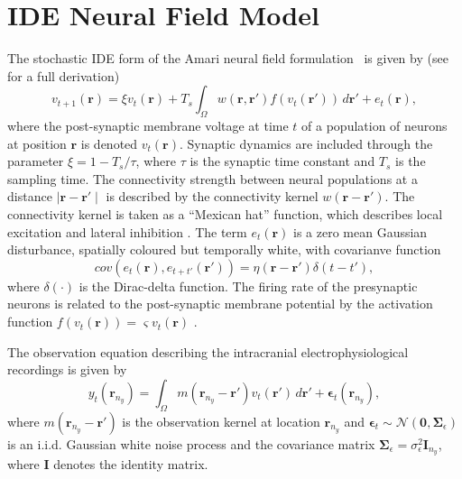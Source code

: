 \documentclass[11pt,draftcls,onecolumn,peerreview]{IEEEtran}
\begin{document}
\section{IDE Neural Field Model}
The stochastic IDE form of the Amari neural field  formulation~\cite{Amari1977} is given by (see~\cite{Freestone2011} for a full derivation)
\begin{equation}\label{eq:DiscreteTimeModel}
	v_{t+1}\left(\mathbf{r}\right) = 
	\xi v_t\left(\mathbf{r}\right) + 
	T_s \int_\Omega { 
	    w\left(\mathbf{r},\mathbf{r'}\right)
	    f\left(v_t\left(\mathbf{r}'\right)\right) 
	\, d\mathbf{r}'} 
	+ e_t\left(\mathbf{r}\right), 
\end{equation}
where the post-synaptic membrane voltage at time $t$ of a population of neurons at position $\mathbf r$ is denoted $v_t\left(\mathbf r\right)$. Synaptic dynamics are included through the parameter $\xi=1-T_s/\tau$, where $\tau$ is the synaptic time constant and $T_s$ is the sampling time. The connectivity strength between neural populations at a distance $\mid\mathbf{r}-\mathbf{r'}\mid$ is described by the connectivity kernel $w\left(\mathbf{r}-\mathbf{r}'\right)$. The connectivity kernel is taken as a ``Mexican hat'' function, which describes local excitation and lateral inhibition \cite{Amari1977,Atay2005}. The term $e_t(\mathbf r)$ is a zero mean Gaussian disturbance, spatially coloured but temporally white, with covarianve function 
\begin{equation}
cov\left(e_{t}\left(\mathbf{r}\right),e_{t+t'}\left(\mathbf{r'}\right)\right)=\eta(\mathbf{r}-\mathbf{r'})\delta(t-t'),
\label{eq:FieldDisturbance}
\end{equation}
where $\delta(\cdot)$ is the Dirac-delta function. The firing rate of the presynaptic neurons is related to the post-synaptic membrane potential by the activation function $f(v_t(\mathbf{r})) = \varsigma v_t(\mathbf{r})$ \cite{VanRotterdam1982,Murphy2009}.

The observation equation describing the intracranial electrophysiological recordings is given by
\begin{equation}\label{eq:ObservationEquation}
	y_t(\mathbf{r}_{n_y}) = \int_{\Omega} { m\left(\mathbf{r}_{n_y}-\mathbf{r}'\right) v_t\left(\mathbf{r}'\right) \, d\mathbf{r}'} + \boldsymbol\epsilon_t(\mathbf{r}_{n_y}), 
\end{equation}
where $m\left(\mathbf{r}_{n_y}-\mathbf{r}'\right)$ is the observation kernel at location $\mathbf{r}_{n_y}$ and  $\boldsymbol{\epsilon}_{t}\sim \mathcal{N}\left(\mathbf{0},\mathbf{\Sigma}_{\epsilon}\right)$  is an i.i.d. Gaussian white noise process and the covariance matrix $\mathbf{\Sigma}_{\epsilon}=\sigma^2_{\epsilon}\mathbf I_{n_y}$, where $\mathbf I$ denotes the identity matrix. 
\end{document}
